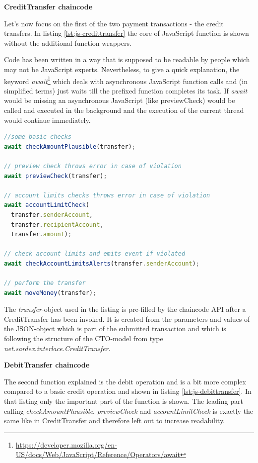 \textbf{CreditTransfer chaincode}

Let's now focus on the first of the two payment transactions - the credit transfers. In listing \ref{lst:js-credittransfer} the core of JavaScript function is shown without the additional function wrappers.

Code has been written in a way that is supposed to be readable by people which may not be JavaScript experts. Nevertheless, to give a quick explanation, the keyword \textit{await}\footnote{\url{https://developer.mozilla.org/en-US/docs/Web/JavaScript/Reference/Operators/await}} which deals with asynchronous JavaScript function calls and (in simplified terms) just waits till the prefixed function completes its task. If \textit{await} would be missing an asynchronous JavaScript (like previewCheck) would be called and executed in the background and the execution of the current thread would continue immediately.

\begin{center}
\begin{minipage}{0.8\textwidth}
\small
\begin{lstlisting}[language=javascript,firstnumber=1,caption={\bf\small CreditTransfer JavaScript}, captionpos=b,label=lst:js-credittransfer]
//some basic checks
await checkAmountPlausible(transfer);

// preview check throws error in case of violation
await previewCheck(transfer);

// account limits checks throws error in case of violation
await accountLimitCheck(
  transfer.senderAccount,
  transfer.recipientAccount,
  transfer.amount);

// check account limits and emits event if violated
await checkAccountLimitsAlerts(transfer.senderAccount);

// perform the transfer
await moveMoney(transfer);
\end{lstlisting}
\end{minipage}
\end{center}

The \textit{transfer}-object used in the listing is pre-filled by the chaincode API after a CreditTransfer has been invoked. It is created from the parameters and values of the JSON-object which is part of the submitted transaction and which is following the structure of the CTO-model from type \textit{net.sardex.interlace.CreditTransfer}.

\textbf{DebitTransfer chaincode}

The second function explained is the debit operation and is a bit more complex compared to a basic credit operation and shown in listing \ref{lst:js-debittransfer}. In that listing only the important part of the function is shown. The leading part calling \textit{checkAmountPlausible}, \textit{previewCheck} and \textit{accountLimitCheck} is exactly the same like in CreditTransfer and therefore left out to increase readability.

